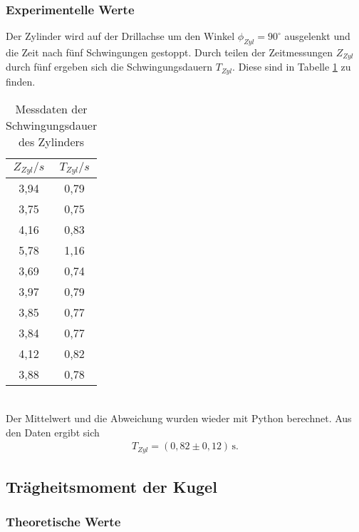 \subsubsection{Experimentelle Werte}
Der Zylinder wird auf der Drillachse um den Winkel $\phi_{Zyl} = 90^{\circ}$ ausgelenkt und die Zeit
nach fünf Schwingungen gestoppt.
Durch teilen der Zeitmessungen $Z_{Zyl}$ durch fünf ergeben sich die Schwingungsdauern $T_{Zyl}$. 
Diese sind in Tabelle \ref{tab:T_Zyl} zu finden.
\begin{table}
  \centering
  \caption{Messdaten der Schwingungsdauer des Zylinders}
  \label{tab:T_Zyl}
  \begin{tabular}{c c}
    \toprule
    $Z_{Zyl}/s$ & $T_{Zyl}/s$ \\
    \midrule
    3,94 & 0,79 \\
    3,75 & 0,75 \\
    4,16 & 0,83 \\
    5,78 & 1,16 \\
    3,69 & 0,74 \\
    3,97 & 0,79 \\
    3,85 & 0,77 \\
    3,84 & 0,77 \\
    4,12 & 0,82 \\
    3,88 & 0,78 \\
    \bottomrule
  \end{tabular}
\end{table}
\\
Der Mittelwert und die Abweichung wurden wieder mit Python berechnet.
Aus den Daten ergibt sich
\begin{align*}
  T_{Zyl} = (0{,}82 \pm 0{,}12)\, \mathrm{s} .
\end{align*}

\subsection{Trägheitsmoment der Kugel}
\label{sec:TraegheitsmomentderKugel}
\subsubsection{Theoretische Werte}

